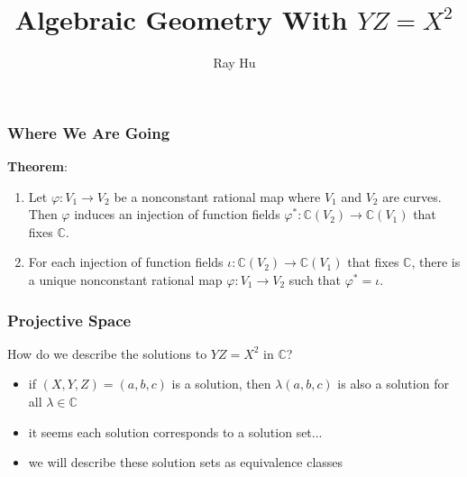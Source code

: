 \documentclass{beamer}
\title{Algebraic Geometry With \(YZ = X^2\)}
\author{Ray Hu}
\date{}
\theoremstyle{definition}
\begin{document}
\maketitle

\begin{frame}
    \frametitle{Where We Are Going}
    \textbf{Theorem}:         \begin{enumerate}
            \item Let \(\varphi: V_1\to V_2\) be a nonconstant rational map where \(V_1\) and \(V_2\) are curves. Then \(\varphi\) induces an injection of function fields \(\varphi^\ast: \mathbb{C}(V_2) \to \mathbb{C}(V_1)\) that fixes \(\mathbb{C}\).

            \item For each injection of function fields \(\iota : \mathbb{C}(V_2)\to \mathbb{C}(V_1)\) that fixes \(\mathbb{C}\), there is a unique nonconstant rational map \(\varphi: V_1 \to V_2\) such that \(\varphi^\ast = \iota\).

    \end{enumerate}
\end{frame}
\begin{frame}
    \frametitle{Projective Space}
How do we describe the solutions to \(YZ = X^2\) in \(\mathbb{C}\)?
      \begin{itemize}
          \item[\textrightarrow] if \((X, Y, Z) = (a, b, c)\) is a solution, then \(\lambda (a, b, c)\) is also a solution for all \(\lambda \in \mathbb{C}\)
          \item[\textrightarrow] it seems each solution corresponds to a solution set...
        \item[\textrightarrow] we will describe these solution sets as equivalence classes

        \end{itemize}

    \end{frame}
\end{document}
